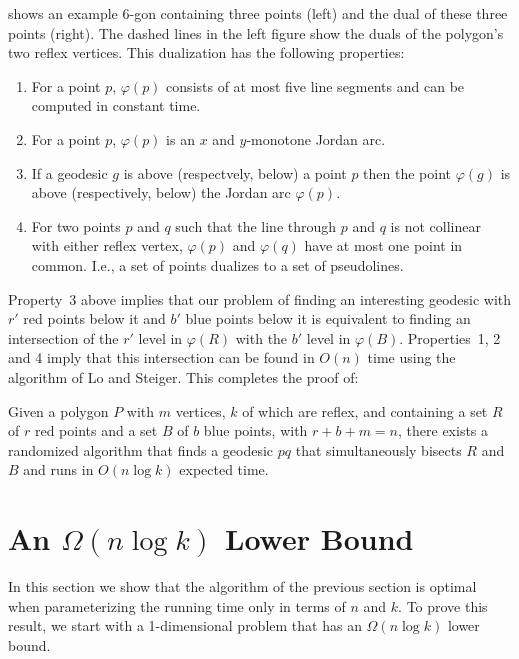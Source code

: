\documentclass[charterfonts,lotsofwhite]{patmorin}
\newcommand{\dual}[1]{\varphi(#1)}
\begin{document}
 shows an example 6-gon containing three points
(left) and the dual of these three points (right).  The dashed lines
in the left figure show the duals of the polygon's two reflex
vertices.  This dualization has the following properties:
\begin{enumerate}
\item For a point $p$, $\dual{p}$ consists of at most five line
segments and can be computed in constant time.

\item For a point $p$, $\dual{p}$ is an $x$ and $y$-monotone Jordan
arc. 

\item If a geodesic $g$ is above (respectvely, below) a point $p$ then
the point $\dual{g}$ is above (respectively, below) the Jordan arc
$\dual{p}$.

\item For two points $p$ and $q$ such that the line through $p$ and
$q$ is not collinear with either reflex vertex, $\dual{p}$ and
$\dual{q}$ have at most one point in common.  I.e., a set of
points dualizes to a set of pseudolines.

\end{enumerate}

Property~3 above implies that our problem of finding an interesting
geodesic with $r'$ red points below it and $b'$ blue points below it
is equivalent to finding an intersection of the $r'$ level in
$\dual{R}$ with the $b'$ level in $\dual{B}$.  Properties~1, 2 and 4
imply that this intersection can be found in $O(n)$ time using the
algorithm of Lo and Steiger.  This completes the proof of:

\begin{thm}
Given a polygon $P$ with $m$ vertices, $k$ of which are reflex, and
containing a set $R$ of $r$ red points and a set $B$ of $b$ blue
points, with $r+b+m=n$, there exists a randomized algorithm that finds
a geodesic $pq$ that simultaneously bisects $R$ and $B$ and runs in
$O(n\log k)$ expected time.
\end{thm}

\section{An \boldmath $\Omega(n\log k)$ Lower
Bound}

In this section we show that the algorithm of the previous section is
optimal when parameterizing the running time only in terms of $n$ and
$k$.  To prove this result, we start with a 1-dimensional problem that
has an $\Omega(n\log k)$ lower bound.
\end{document}
